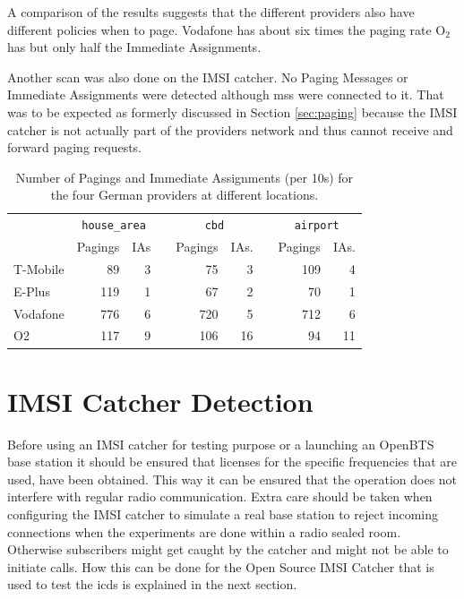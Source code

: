 A comparison of the results suggests that the different providers also have different policies when to page.
Vodafone has about six times the paging rate O$_{2}$ has but only half the Immediate Assignments.

Another scan was also done on the IMSI catcher.
No Paging Messages or Immediate Assignments were detected although \glspl{ms} were connected to it.
That was to be expected as formerly discussed in Section \ref{sec:paging} because the IMSI catcher is not actually part of the providers network and thus cannot receive and forward paging requests.

\begin{table}
\centering
\begin{tabular}{lrrcrrcrr}
\toprule
& \multicolumn{2}{c}{\texttt{house\_area}} &\phantom{a}& \multicolumn{2}{c}{\texttt{cbd}} &\phantom{a} & \multicolumn{2}{c}{\texttt{airport}}\\
\cmidrule{2-3} \cmidrule{5-6} \cmidrule{8-9}
&Pagings&IAs&	&Pagings &IAs.&	&Pagings&IAs.\\
\midrule
T-Mobile&		89&3&	&75&3&	&109&4\\
E-Plus&		119&1&	&67&2&	&70&1\\
Vodafone&		776&6&	&720&5&	&712&6\\
O2&		117&9&	&106&16&	&94&11\\
\bottomrule
\end{tabular}
\caption{Number of Pagings and Immediate Assignments (per 10\;s) for the four German providers at different locations.}
\label{tab:pagings}
\end{table}

\section{IMSI Catcher Detection}
Before using an IMSI catcher for testing purpose or a launching an OpenBTS base station it should be ensured that licenses for the specific frequencies that are used, have been obtained.
This way it can be ensured that the operation does not interfere with regular radio communication.
Extra care should be taken when configuring the IMSI catcher to simulate a real base station to reject incoming connections when the experiments are done within a radio sealed room.
Otherwise subscribers might get caught by the catcher and might not be able to initiate calls.
How this can be done for the Open Source IMSI Catcher that is used to test the \gls{icds} is explained in the next section.

